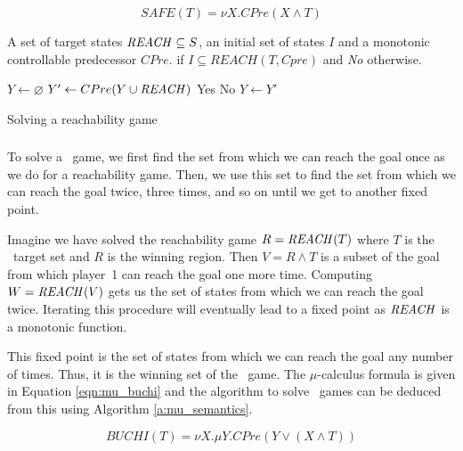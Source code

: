 \begin{equation}
\mathit{SAFE}(T) = \nu X. CPre(X \wedge T)
\label{eqn:mu_safe}
\end{equation}

\begin{algorithm}
\begin{algorithmic}

\Require A set of target states $\mathit{REACH} \subseteq S$, an initial set of states $I$ and a monotonic controllable predecessor $CPre$.
 if $I \subseteq REACH(T, Cpre)$ and {\it No} otherwise.

    \State $Y \gets \varnothing$
    \Loop
        \State $Y' \gets CPre(Y \cup \mathit{REACH})$
                \State\Return Yes
            \Else
                \State\Return No
            \EndIf
        \EndIf
        \State $Y \gets Y'$
    \EndLoop
\EndFunction

\end{algorithmic}
\caption{Solving a reachability game}
\label{a:reach}
\end{algorithm}

\subsubsection{\buchi}

To solve a \buchi\ game, we first find the set from which we can reach the goal once as we do for a reachability game. Then, we use this set to find the set from which we can reach the goal twice, three times, and so on until we get to another fixed point. 

Imagine we have solved the reachability game $R = \mathit{REACH}(T)$ where $T$ is the \buchi\ target set and $R$ is the winning region. Then $V = R \wedge T$ is a subset of the goal from which player~1 can reach the goal one more time. Computing $W = \mathit{REACH}(V)$ gets us the set of states from which we can reach the goal twice. Iterating this procedure will eventually lead to a fixed point as $\mathit{REACH}$ is a monotonic function.

This fixed point is the set of states from which we can reach the goal any number of times. Thus, it is the winning set of the \buchi\ game. The $\mu$-calculus formula is given in Equation \ref{eqn:mu_buchi} and the algorithm to solve \buchi\ games can be deduced from this using Algorithm \ref{a:mu_semantics}.

\begin{equation}
    \mathit{BUCHI}(T) = \nu X. \mu Y. CPre(Y \vee (X \wedge T))
\label{eqn:mu_buchi}
\end{equation}

